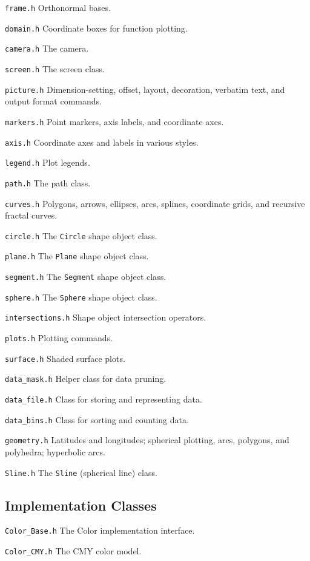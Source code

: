 \documentclass[12pt,letterpaper]{book}
\newcommand{\code}[1]{\texttt{#1}}
\newcommand{\Header}[1]{\smallskip\noindent\texttt{#1}\quad}%
\begin{document}
\Header{frame.h} Orthonormal bases.

\Header{domain.h} Coordinate boxes for function plotting.

\Header{camera.h} The camera.

\Header{screen.h} The screen class.

\Header{picture.h} Dimension-setting, offset, layout, decoration,
verbatim text, and output format commands.

\Header{markers.h} Point markers, axis labels, and coordinate axes.

\Header{axis.h} Coordinate axes and labels in various styles.

\Header{legend.h} Plot legends.

\Header{path.h} The path class.

\Header{curves.h} Polygons, arrows, ellipses, arcs, splines,
coordinate grids, and recursive fractal curves.

\Header{circle.h} The \code{Circle} shape object class.

\Header{plane.h} The \code{Plane} shape object class.

\Header{segment.h} The \code{Segment} shape object class.

\Header{sphere.h} The \code{Sphere} shape object class.

\Header{intersections.h} Shape object intersection operators.

\Header{plots.h} Plotting commands.

\Header{surface.h} Shaded surface plots.

\Header{data\_mask.h} Helper class for data pruning.

\Header{data\_file.h} Class for storing and representing data.

\Header{data\_bins.h} Class for sorting and counting data.

\Header{geometry.h} Latitudes and longitudes; spherical plotting,
arcs, polygons, and polyhedra; hyperbolic arcs.

\Header{Sline.h} The \code{Sline} (spherical line) class.


\subsection{Implementation Classes}

\Header{Color\_Base.h} The Color implementation interface.

\Header{Color\_CMY.h} The CMY color model.
\end{document}
